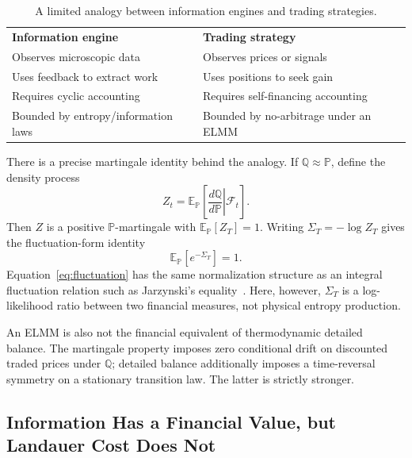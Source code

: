 \documentclass[aps,pra,reprint,superscriptaddress,amsmath,amssymb]{revtex4-2}
\theoremstyle{plain}
\theoremstyle{definition}
\theoremstyle{remark}
\begin{document}
\begin{table}[htbp]
\caption{\label{tab:demon}A limited analogy between information engines and trading strategies.}
\centering
\begin{ruledtabular}
\begin{tabular}{p{}p{}}
\textbf{Information engine} & \textbf{Trading strategy} \\
\colrule
Observes microscopic data & Observes prices or signals \\
Uses feedback to extract work & Uses positions to seek gain \\
Requires cyclic accounting & Requires self-financing accounting \\
Bounded by entropy/information laws & Bounded by no-arbitrage under an ELMM \\
\end{tabular}
\end{ruledtabular}
\end{table}

There is a precise martingale identity behind the analogy. If
\(\mathbb{Q}\approx\mathbb{P}\), define the density process
\begin{equation}
  Z_t=\mathbb{E}_{\mathbb{P}}\!\left[
    \left.\frac{d\mathbb{Q}}{d\mathbb{P}}\right|\mathcal{F}_t
  \right].
  \label{eq:density}
\end{equation}
Then \(Z\) is a positive \(\mathbb{P}\)-martingale with
\(\mathbb{E}_{\mathbb{P}}[Z_T]=1\). Writing
\(\Sigma_T=-\log Z_T\) gives the fluctuation-form identity
\begin{equation}
  \mathbb{E}_{\mathbb{P}}\!\left[e^{-\Sigma_T}\right]=1.
  \label{eq:fluctuation}
\end{equation}
Equation~\eqref{eq:fluctuation} has the same normalization structure as an
integral fluctuation relation such as Jarzynski's
equality~\cite{Jarzynski1997}. Here, however, \(\Sigma_T\) is a
log-likelihood ratio between two financial measures, not physical entropy
production.

An ELMM is also not the financial equivalent of thermodynamic detailed
balance. The martingale property imposes zero conditional drift on discounted
traded prices under \(\mathbb{Q}\); detailed balance additionally imposes a
time-reversal symmetry on a stationary transition law. The latter is strictly
stronger.

\subsection{Information Has a Financial Value, but Landauer Cost Does Not}
\end{document}
